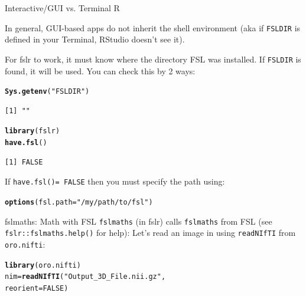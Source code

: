 \documentclass[11pt]{beamer}\usepackage[]{graphicx}\usepackage[]{color}
\makeatletter
\newcommand{\hlnum}[1]{\textcolor[rgb]{0.686,0.059,0.569}{#1}}%
\newcommand{\hlstr}[1]{\textcolor[rgb]{0.192,0.494,0.8}{#1}}%
\newcommand{\hlstd}[1]{\textcolor[rgb]{0.345,0.345,0.345}{#1}}%
\newcommand{\hlkwb}[1]{\textcolor[rgb]{0.69,0.353,0.396}{#1}}%
\newcommand{\hlkwc}[1]{\textcolor[rgb]{0.333,0.667,0.333}{#1}}%
\newcommand{\hlkwd}[1]{\textcolor[rgb]{0.737,0.353,0.396}{\textbf{#1}}}%
\newenvironment{kframe}{%
 \def\at@end@of@kframe{}%
 \ifinner\ifhmode%
  \def\at@end@of@kframe{\end{minipage}}%
  \begin{minipage}{\columnwidth}%
 \fi\fi%
 \def\FrameCommand##1{\hskip\@totalleftmargin \hskip-\fboxsep
 \colorbox{shadecolor}{##1}\hskip-\fboxsep
     \hskip-\linewidth \hskip-\@totalleftmargin \hskip\columnwidth}%
 \MakeFramed {\advance\hsize-\width
   \@totalleftmargin\z@ \linewidth\hsize
   \@setminipage}}%
 {\par\unskip\endMakeFramed%
 \at@end@of@kframe}
\newenvironment{knitrout}{}{} %
\makeatother
\begin{document}
\begin{frame}[fragile]{Interactive/GUI vs. Terminal R}

In general, GUI-based apps do not inherit the shell environment (aka if \verb|FSLDIR| is defined in your Terminal, RStudio doesn't see it).

For fslr to work, it must know where the directory FSL was installed.  If \verb|FSLDIR| is found, it will be used.  You can check this by 2 ways:

\begin{knitrout}
\color{fgcolor}\begin{kframe}
\begin{alltt}
\hlkwd{Sys.getenv}\hlstd{(}\hlstr{"FSLDIR"}\hlstd{)}
\end{alltt}
\begin{verbatim}
[1] ""
\end{verbatim}
\begin{alltt}
\hlkwd{library}\hlstd{(fslr)}
\hlkwd{have.fsl}\hlstd{()}
\end{alltt}
\begin{verbatim}
[1] FALSE
\end{verbatim}
\end{kframe}
\end{knitrout}

If \verb|have.fsl()= FALSE| then you must specify the path using:

\begin{knitrout}
\color{fgcolor}\begin{kframe}
\begin{alltt}
\hlkwd{options}\hlstd{(}\hlkwc{fsl.path}\hlstd{=}\hlstr{"/my/path/to/fsl"}\hlstd{)}
\end{alltt}
\end{kframe}
\end{knitrout}



\end{frame}


\begin{frame}[fragile]{fslmaths: Math with FSL}
\verb|fslmaths| (in fslr) calls \verb|fslmaths| from FSL (see \verb|fslr::fslmaths.help()| for help):
Let's read an image in using \verb|readNIfTI| from \verb|oro.nifti|:

\begin{knitrout}
\color{fgcolor}\begin{kframe}
\begin{alltt}
\hlkwd{library}\hlstd{(oro.nifti)}
\hlstd{nim} \hlkwb{=} \hlkwd{readNIfTI}\hlstd{(}\hlstr{"Output_3D_File.nii.gz"}\hlstd{,}
\hlkwc{reorient}\hlstd{=}\hlnum{FALSE}\hlstd{)}
\end{alltt}
\end{kframe}
\end{knitrout}
\end{frame}
\end{document}
